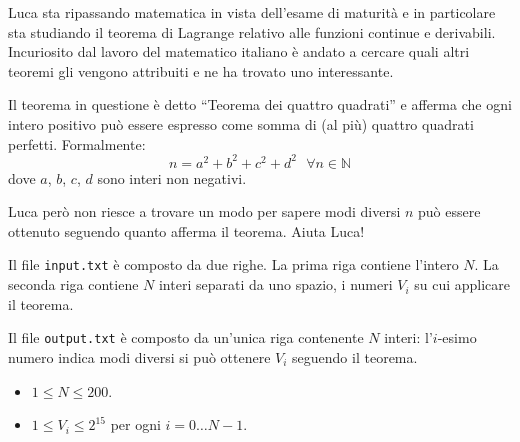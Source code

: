 \usepackage{xcolor}
\usepackage{afterpage}
\usepackage{pifont,mdframed}
\usepackage[bottom]{footmisc}
\usepackage{hyperref}

\makeatletter
\gdef\this@inputfilename{input.txt}
\gdef\this@outputfilename{output.txt}
\makeatother

\newcommand{\inputfile}{\texttt{input.txt}}
\newcommand{\outputfile}{\texttt{output.txt}}

\newenvironment{warning}
  {\par\begin{mdframed}[linewidth=2pt,linecolor=gray]%
    \begin{list}{}{\leftmargin=1cm
                   \labelwidth=\leftmargin}\item[\Large\ding{43}]}
  {\end{list}\end{mdframed}\par}

    Luca sta ripassando matematica in vista dell'esame di maturità e in particolare sta studiando il teorema di Lagrange relativo alle funzioni continue e derivabili. Incuriosito dal lavoro del matematico italiano è andato a cercare quali altri teoremi gli vengono attribuiti e ne ha trovato uno interessante.

    Il teorema in questione è detto ``Teorema dei quattro quadrati'' e afferma che ogni intero positivo può essere espresso come somma di (al più) quattro quadrati perfetti. Formalmente:
    \begin{equation*}
        n = a^2 + b^2 + c^2 + d^2 \ \ \ \forall {n} \in \mathbb{N}
    \end{equation*}
    dove $a$, $b$, $c$, $d$ sono interi non negativi.

    Luca però non riesce a trovare un modo per sapere  modi diversi $n$ può essere ottenuto seguendo quanto afferma il teorema. Aiuta Luca!


\InputFile
Il file \inputfile{} è composto da due righe. La prima riga contiene l'intero $N$. La seconda riga contiene $N$ interi separati da uno spazio, i numeri $V_i$ su cui applicare il teorema.

\OutputFile
Il file \outputfile{} è composto da un'unica riga contenente $N$ interi: l'$i$-esimo numero indica  modi diversi si può ottenere $V_i$ seguendo il teorema.

\Constraints
\begin{itemize}[nolistsep, itemsep=2mm]
	\item $1 \le N \le 200$.
	\item $1 \le V_i \le 2^{15}$ per ogni $i=0\ldots N-1$.
\end{itemize}

